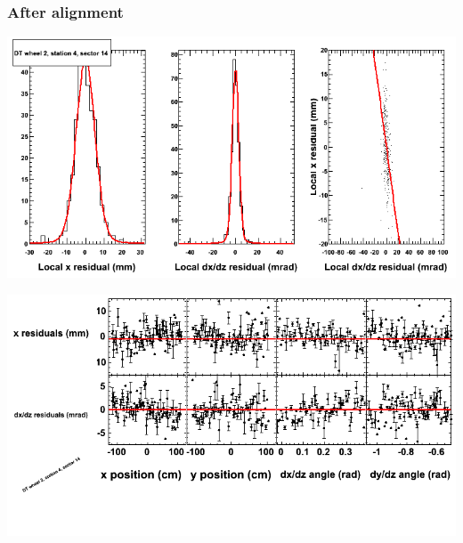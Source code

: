 \documentclass[compress]{beamer}
\begin{document}
\begin{frame}
\frametitle{After alignment}
\includegraphics[width=0.7\linewidth]{NOV4_fitfunctions/MBwhEst4sec14_bellcurves.png}

\includegraphics[width=0.7\linewidth]{NOV4_fitfunctions/MBwhEst4sec14_polynomials.png}
\end{frame}
\end{document}
